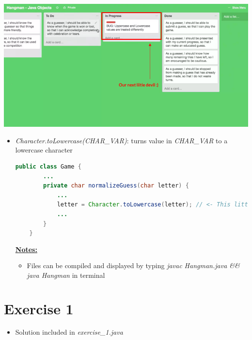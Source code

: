 \documentclass[12pt]{article}
\begin{document}
\begin{center}
\includegraphics[width=\linewidth]{images/part_4_notes_2.png}
\end{center}

\begin{itemize}
    \item \textit{Character.toLowercase(CHAR\_VAR)}: turns value in \textit{CHAR\_VAR}
    to a lowercase character


    \begin{lstlisting}[language=Java,caption={lesson\_02/Game.java}]
    public class Game {
        ...
        private char normalizeGuess(char letter) {
            ...
            letter = Character.toLowercase(letter); // <- This little guy here :)
            ...
        }
    }
    \end{lstlisting}

    \bigskip

    \underline{\textbf{Notes:}}

    \bigskip

    \begin{itemize}
        \item Files can be compiled and displayed by typing \textit{javac Hangman.java \&\& java Hangman}
        in terminal
    \end{itemize}
\end{itemize}

\bigskip

\section{Exercise 1}

\bigskip

\begin{itemize}
    \item Solution included in \textit{exercise\_1.java}
\end{itemize}
\end{document}
